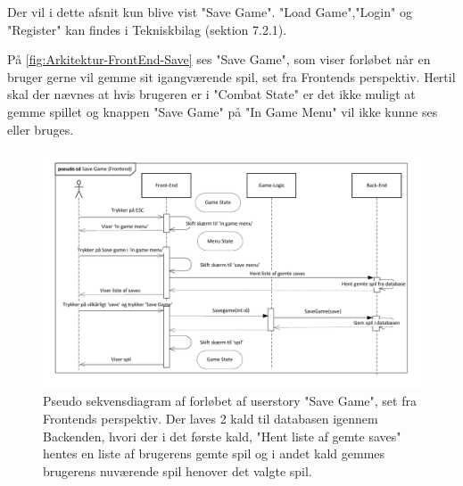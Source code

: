 Der vil i dette afsnit kun blive vist "Save Game". "Load Game","Login" og "Register" kan findes i Tekniskbilag (sektion 7.2.1).

\noindent På \autoref{fig:Arkitektur-FrontEnd-Save} ses "Save Game", som viser forløbet når en bruger gerne vil gemme sit igangværende spil, set fra Frontends perspektiv. 
Hertil skal der nævnes at hvis brugeren er i "Combat State" er det ikke muligt at gemme spillet og knappen "Save Game" på "In Game Menu" vil ikke kunne ses eller bruges.\\

\begin{figure}[H]
\centering
\includegraphics[width = \textwidth]{02-Body/Images/Front-End_-_Arkitektur-savegame.pdf}
\caption{Pseudo sekvensdiagram af forløbet af userstory "Save Game", set fra Frontends perspektiv. Der laves 2 kald til databasen igennem Backenden, hvori der i det første kald,  "Hent liste af gemte saves" hentes en liste af brugerens gemte spil og i andet kald gemmes brugerens nuværende spil henover det valgte spil.}
\label{fig:Arkitektur-FrontEnd-Save}
\end{figure}

\newpage
